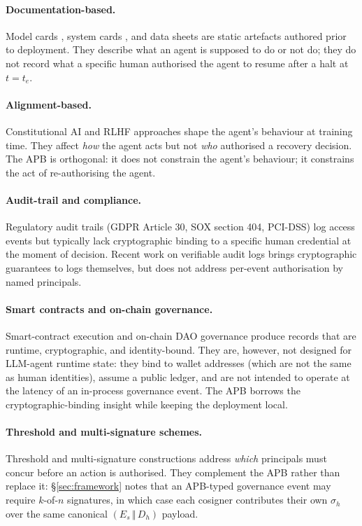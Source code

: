 \documentclass[11pt]{article}
\newcommand{\Es}{E_s}
\newcommand{\Dh}{D_h}
\newcommand{\sigh}{\sigma_h}
\begin{document}
\paragraph{Documentation-based.}
Model cards \citep{mitchell2019model}, system cards
\citep{openai2024systemcard}, and data sheets are static artefacts
authored prior to deployment. They describe what an agent is supposed
to do or not do; they do not record what a specific human authorised
the agent to resume after a halt at $t = t_e$.

\paragraph{Alignment-based.}
Constitutional AI \citep{bai2022constitutional} and RLHF approaches
shape the agent's behaviour at training time. They affect \emph{how}
the agent acts but not \emph{who} authorised a recovery decision.
The APB is orthogonal: it does not constrain the agent's behaviour;
it constrains the act of re-authorising the agent.

\paragraph{Audit-trail and compliance.}
Regulatory audit trails (GDPR Article 30, SOX section 404, PCI-DSS)
log access events but typically lack cryptographic binding to a
specific human credential at the moment of decision. Recent work on
verifiable audit logs \citep{transparencylog2014} brings cryptographic
guarantees to logs themselves, but does not address per-event
authorisation by named principals.

\paragraph{Smart contracts and on-chain governance.}
Smart-contract execution \citep{wood2014ethereum} and on-chain DAO
governance produce records that are runtime, cryptographic, and
identity-bound. They are, however, not designed for LLM-agent runtime
state: they bind to wallet addresses (which are not the same as
human identities), assume a public ledger, and are not intended to
operate at the latency of an in-process governance event. The APB
borrows the cryptographic-binding insight while keeping the
deployment local.

\paragraph{Threshold and multi-signature schemes.}
Threshold and multi-signature constructions
\citep{boneh2018compact,gennaro2018fast} address \emph{which}
principals must concur before an action is authorised. They
complement the APB rather than replace it: \S\ref{sec:framework}
notes that an APB-typed governance event may require $k$-of-$n$
signatures, in which case each cosigner contributes their own
$\sigh$ over the same canonical $(\Es \,\Vert\, \Dh)$ payload.
\end{document}
